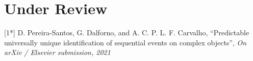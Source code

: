    \section{Under Review}

[1*] D. Pereira-Santos, G. Dalforno, and A. C. P. L. F. Carvalho, “Predictable universally unique identification of sequential events on complex objects”, \textit{On arXiv / Elsevier submission, 2021}

\nocite{*}
\printbibliography[title=Publications]

